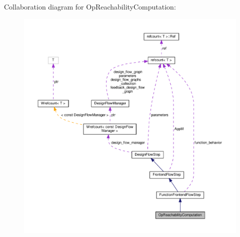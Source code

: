 Collaboration diagram for Op\+Reachability\+Computation\+:
\nopagebreak
\begin{figure}[H]
\begin{center}
\leavevmode
\includegraphics[width=350pt]{d3/d89/classOpReachabilityComputation__coll__graph}
\end{center}
\end{figure}
